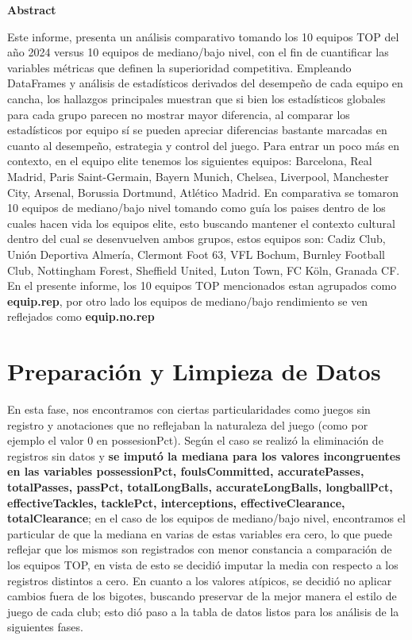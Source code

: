 \documentclass[12pt,a4paper]{article}
\begin{document}
	\vspace*{1cm}
	\begin{center}
	{\Large\textbf{Abstract}}\\[0.3cm]
	\end{center} 
	Este informe, presenta un análisis comparativo tomando los 10 equipos TOP del año 2024 versus 10 equipos de mediano/bajo nivel, con el fin de cuantificar las variables métricas que definen la superioridad competitiva. Empleando DataFrames y análisis de estadísticos derivados del desempeño de cada equipo en cancha, los hallazgos principales muestran que si bien los estadísticos globales para cada grupo parecen no mostrar mayor diferencia, al comparar los estadísticos por equipo sí se pueden apreciar diferencias bastante marcadas en cuanto al desempeño, estrategia y control del juego. 
	Para entrar un poco más en contexto, en el equipo elite tenemos los siguientes equipos: Barcelona, Real Madrid, Paris Saint-Germain, Bayern Munich, Chelsea,
	Liverpool, Manchester City, Arsenal, Borussia Dortmund, Atlético Madrid.
	En comparativa se tomaron 10 equipos de mediano/bajo nivel tomando como guía los paises dentro de los cuales hacen vida los equipos elite, esto buscando mantener el contexto cultural dentro del cual se desenvuelven ambos grupos, estos equipos son: Cadiz Club, Unión Deportiva Almería, Clermont Foot 63, VFL Bochum, Burnley Football Club, Nottingham Forest, Sheffield United, Luton Town, FC Köln, Granada CF.\\[0.3cm]
	En el presente informe, los 10 equipos TOP mencionados estan agrupados como \textbf{equip.rep}, por otro lado los equipos de mediano/bajo rendimiento se ven reflejados como \textbf{equip.no.rep}
	\newpage
	\section{Preparación y Limpieza de Datos}
	En esta fase, nos encontramos con ciertas particularidades como juegos sin registro y anotaciones que no reflejaban la naturaleza del juego (como por ejemplo el valor 0 en possesionPct).  Según el caso se realizó la eliminación de registros sin datos y \textbf{se imputó la mediana para los valores incongruentes en las variables possessionPct, foulsCommitted, accuratePasses, totalPasses, passPct, totalLongBalls, accurateLongBalls, longballPct, effectiveTackles, tacklePct, interceptions, effectiveClearance, totalClearance}; en el caso de los equipos de mediano/bajo nivel, encontramos el particular de que la mediana en varias de estas variables era cero, lo que puede reflejar que los mismos son registrados con menor constancia a comparación de los equipos TOP, en vista de esto se decidió imputar la media con respecto a los registros distintos a cero. En cuanto a los valores atípicos, se decidió no aplicar cambios fuera de los bigotes, buscando preservar de la mejor manera el estilo de juego de cada club; esto dió paso a la tabla de datos listos para los análisis de la siguientes fases.
	
\end{document}
